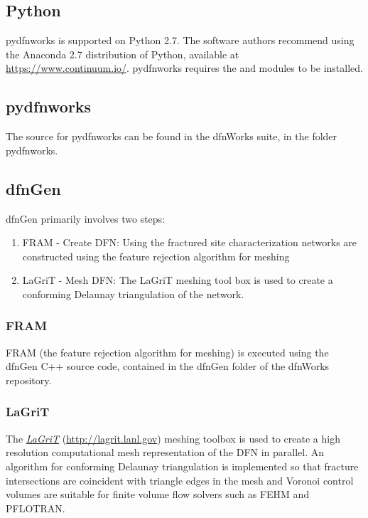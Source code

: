 \documentclass[letterpaper,10pt,english]{sphinxmanual}
\begin{document}
\subsection{Python}
\label{intro:python}
pydfnworks is supported on Python 2.7. The software authors recommend using the Anaconda 2.7 distribution of Python, available at \href{https://www.continuum.io/}{https://www.continuum.io/}.
pydfnworks requires the  and  modules to be installed.


\subsection{pydfnworks}
\label{intro:pydfnworks}
The source for pydfnworks can be found in the dfnWorks suite, in the folder pydfnworks.


\subsection{dfnGen}
\label{intro:dfngen}
dfnGen primarily involves two steps:
\begin{enumerate}
\item {} 
FRAM - Create DFN: Using the fractured site characterization networks are constructed using the feature rejection algorithm for meshing

\item {} 
LaGriT - Mesh DFN: The LaGriT meshing tool box is used to create a conforming Delaunay triangulation of the network.

\end{enumerate}


\subsubsection{FRAM}
\label{intro:fram}
FRAM (the feature rejection algorithm for meshing) is executed using the dfnGen C++ source code, contained in the dfnGen folder of the dfnWorks repository.


\subsubsection{LaGriT}
\label{intro:lagrit}
The {\hyperref[intro:lagrit]{\emph{LaGriT}}} (\href{http://lagrit.lanl.gov}{http://lagrit.lanl.gov}) meshing toolbox is used to create a high resolution computational mesh representation of the DFN in parallel. An algorithm for conforming Delaunay triangulation is implemented so that fracture intersections are coincident with triangle edges in the mesh and Voronoi control volumes are suitable for finite volume flow solvers such as FEHM and PFLOTRAN.
\end{document}
